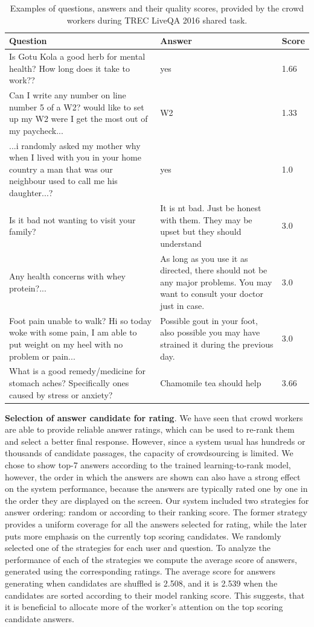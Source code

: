 \begin{table}
\centering
\small
\begin{tabular}{p{6cm}|p{5cm}|l}
Question & Answer & Score \\
\hline
 Is Gotu Kola a good herb for mental health? How long does it take to work?? & yes & 1.66\\
 \hline
Can I write any number on line number 5 of a W2?  would like to set up my W2 were I get the most out of my paycheck... & W2 & 1.33\\
 \hline
...i randomly asked my mother why when I lived with you in your home country a man that was our neighbour used to call me his daughter...? & yes & 1.0\\
\hline
\hline
 Is it bad not wanting to visit your family? & It is nt bad. Just be honest with them. They may be upset but they should understand & 3.0 \\
 \hline
Any health concerns with whey protein?... & As long as you use it as directed, there should not be any major problems.  You may want to consult your doctor just in case. & 3.0\\
\hline
Foot pain unable to walk? Hi so today woke with some pain, I am able to put weight on my heel with no problem or pain... & Possible gout in your foot, also possible you may have strained it during the previous day. & 3.0\\
\hline
What is a good remedy/medicine for stomach aches? Specifically ones caused by stress or anxiety? & Chamomile tea should help & 3.66\\
\end{tabular}
\caption{Examples of questions, answers and their quality scores, provided by the crowd workers during TREC LiveQA 2016 shared task.}
\label{table:non-factoid:crowdsourcing:crqa:answer_examples}
\end{table}

\textbf{Selection of answer candidate for rating}.
We have seen that crowd workers are able to provide reliable answer ratings, which can be used to re-rank them and select a better final response.
However, since a system usual has hundreds or thousands of candidate passages, the capacity of crowdsourcing is limited.
We chose to show top-7 answers according to the trained learning-to-rank model, however, the order in which the answers are shown can also have a strong effect on the system performance, because the answers are typically rated one by one in the order they are displayed on the screen.
Our system included two strategies for answer ordering: random or according to their ranking score.
The former strategy provides a uniform coverage for all the answers selected for rating, while the later puts more emphasis on the currently top scoring candidates.
We randomly selected one of the strategies for each user and question.
To analyze the performance of each of the strategies we compute the average score of answers, generated using the corresponding ratings.
The average score for answers generating when candidates are shuffled is 2.508, and it is 2.539 when the candidates are sorted according to their model ranking score.
This suggests, that it is beneficial to allocate more of the worker's attention on the top scoring candidate answers.


